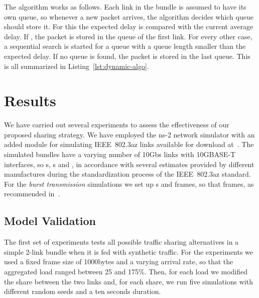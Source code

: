 \documentclass[journal,english,twocolumn,10pt,letterpaper]{IEEEtran}
\begin{document}
The algorithm works as follows. Each link in the bundle is assumed to have its
own queue, so whenever a new packet arrives, the algorithm decides which queue
should store it. For this the expected delay is compared with the current
average delay. If , the packet is stored in the queue of the
first link. For every other case, a sequential search is started for a queue
with a queue length smaller than the expected delay. If no queue is found, the
packet is stored in the last queue. This is all summarized in
Listing~\ref{lst:dynamic-algo}.


\section{Results}
\label{sec:results}

We have carried out several experiments to assess the effectiveness of our
proposed sharing strategy. We have employed the ns-2 network simulator with an
added module for simulating IEEE~802.3az links available for download
at~\cite{14:_networ_simul}. The simulated bundles have a varying number of
10Gbs links with 10GBASE-T interfaces, so s,
s and , in accordance with several
estimates provided by different manufactures during the standardization
process of the IEEE~802.3az standard. For the \emph{burst transmission}
simulations we set up s and frames, so that
frames, as recommended
in~\cite{herreria12:_gi_g_model_gb_energ_effic_ether}.

\subsection{Model Validation}
\label{sec:model-validation}

The first set of experiments tests all possible traffic sharing alternatives
in a simple 2-link bundle when it is fed with synthetic traffic. For the
experiments we used a fixed frame size of 1000bytes and a varying arrival
rate, so that the aggregated load ranged between 25 and 175\%. Then, for each
load we modified the share between the two links and, for each share, we run
five simulations with different random seeds and a ten seconds duration.
\end{document}
